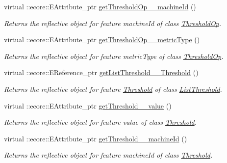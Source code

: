 \begin{DoxyCompactItemize}
virtual ::ecore::EAttribute\_\-ptr \hyperlink{classIMS__Data_1_1IMS__DataPackage_a5579e09ce9f42ebe95e234c63b103370}{getThresholdOp\_\-\_\-machineId} ()
\begin{DoxyCompactList}\small\item\em Returns the reflective object for feature machineId of class \hyperlink{classIMS__Data_1_1ThresholdOp}{ThresholdOp}. \item\end{DoxyCompactList}\item 
virtual ::ecore::EAttribute\_\-ptr \hyperlink{classIMS__Data_1_1IMS__DataPackage_a12a3272c06c49be4221959dc23757b79}{getThresholdOp\_\-\_\-metricType} ()
\begin{DoxyCompactList}\small\item\em Returns the reflective object for feature metricType of class \hyperlink{classIMS__Data_1_1ThresholdOp}{ThresholdOp}. \item\end{DoxyCompactList}\item 
virtual ::ecore::EReference\_\-ptr \hyperlink{classIMS__Data_1_1IMS__DataPackage_a465fa6b2798691210a2fedff0270dc9f}{getListThreshold\_\-\_\-Threshold} ()
\begin{DoxyCompactList}\small\item\em Returns the reflective object for feature \hyperlink{classIMS__Data_1_1Threshold}{Threshold} of class \hyperlink{classIMS__Data_1_1ListThreshold}{ListThreshold}. \item\end{DoxyCompactList}\item 
virtual ::ecore::EAttribute\_\-ptr \hyperlink{classIMS__Data_1_1IMS__DataPackage_a74fdf070d723eabbf08a2fc46aba8c73}{getThreshold\_\-\_\-value} ()
\begin{DoxyCompactList}\small\item\em Returns the reflective object for feature value of class \hyperlink{classIMS__Data_1_1Threshold}{Threshold}. \item\end{DoxyCompactList}\item 
virtual ::ecore::EAttribute\_\-ptr \hyperlink{classIMS__Data_1_1IMS__DataPackage_a5fd8da040badb8fb9feea790d7b0c97b}{getThreshold\_\-\_\-machineId} ()
\begin{DoxyCompactList}\small\item\em Returns the reflective object for feature machineId of class \hyperlink{classIMS__Data_1_1Threshold}{Threshold}. \item\end{DoxyCompactList}\item 

\end{DoxyCompactItemize}
